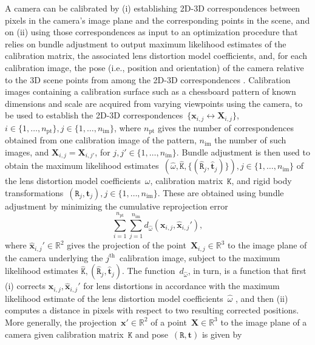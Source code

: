 \documentclass[review]{elsarticle}
\begin{document}
A camera can be calibrated by (i) establishing 2D-3D correspondences between pixels in the camera's image plane and the corresponding points in the scene, and on (ii) using those correspondences as input to an optimization procedure that relies on bundle adjustment \cite{triggs1999bundle} to output maximum likelihood estimates of the calibration matrix, the associated lens distortion model coefficients, and, for each calibration image, the pose (i.e., position and orientation) of the camera relative to the 3D scene points from among the 2D-3D correspondences \cite{Hartley2004,zhang2000flexible}. Calibration images containing a calibration surface such as a chessboard pattern of known dimensions and scale are acquired from varying viewpoints using the camera, to be used to establish the 2D-3D correspondences~$\{\mathbf{x}_{i,j} \leftrightarrow \mathbf{X}_{i,j}\}$, $i \in \{ 1, \dots, n_\text{pt} \}, j \in \{ 1, \dots, n_\text{im} \}$, where $n_\text{pt}$ gives the number of correspondences obtained from one calibration image of the pattern, $n_\text{im}$ the number of such images, and $\mathbf{X}_{i,j} = \mathbf{X}_{i,j'}$, for $j, j' \in \{ 1, \dots, n_\text{im} \}$. Bundle adjustment is then used to obtain the maximum likelihood estimates~$(\hat{\omega}, \hat{\mathtt{K}}, \{(\hat{\mathtt{R}}_j, \hat{\mathbf{t}}_j)\}), j \in \{ 1, \dots, n_\text{im} \}$ of the lens distortion model coefficients~$\omega$, calibration matrix~$\mathtt{K}$, and rigid body transformations~$(\mathtt{R}_j, \mathbf{t}_j), j \in \{ 1, \dots, n_\text{im} \}$. These are obtained using bundle adjustment by minimizing the cumulative reprojection error
\begin{equation}
\sum_{i=1}^{n_\text{pt}} \sum_{j=1}^{n_\text{im}} d_{\hat{\omega}}(\mathbf{x}_{i,j}, \hat{\mathbf{x}}_{i,j}'),
\label{re}
\end{equation}
where $\hat{\mathbf{x}}_{i,j}' \in \mathbb{R}^2$ gives the projection of the point~$\mathbf{X}_{i,j} \in \mathbb{R}^3$ to the image plane of the camera underlying the $j^{\text{th}}$~calibration image, subject to the maximum likelihood estimates $\hat{\mathtt{K}}, (\hat{\mathtt{R}}_j, \hat{\mathbf{t}}_j)$. The function~$d_{\hat{\omega}}$, in turn, is a function that first (i) corrects $\mathbf{x}_{i,j}, \hat{\mathbf{x}}_{i,j}'$ for lens distortions in accordance with the maximum likelihood estimate of the lens distortion model coefficients~$\hat{\omega}$ \cite{duane1971close,weng1992camera}, and then (ii) computes a distance in pixels with respect to two resulting corrected positions. More generally, the projection~$\mathbf{x}' \in \mathbb{R}^2$ of a point~$\mathbf{X} \in \mathbb{R}^3$ to the image plane of a camera given calibration matrix~$\mathtt{K}$ and pose~$(\mathtt{R}, \mathbf{t})$ is given by
\end{document}
